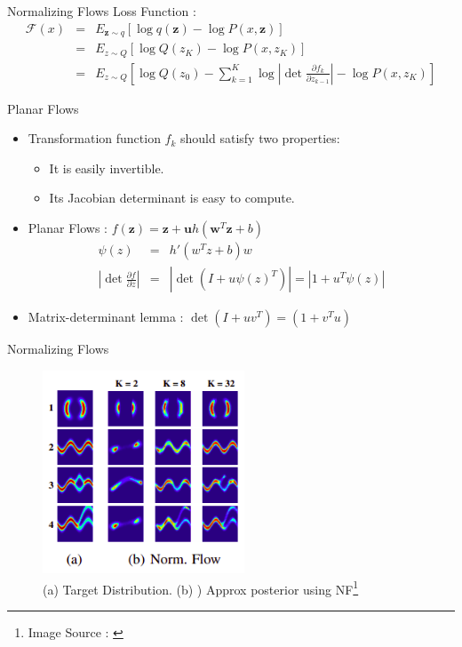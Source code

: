 \documentclass{beamer}
\begin{document}
\begin{frame}{Normalizing Flows}
Loss Function :%
\begin{eqnarray}
\mathcal{F}(x) &=& E_{\mathbf{z} \sim q}[\log q(\mathbf{z}) - \log P(x, \mathbf{z})] \\
&=&  E_{z \sim Q}[\log Q(z_K) - \log P(x, z_K)] \\
&=&  E_{z \sim Q}[\log Q(z_0) - \sum_{k=1}^{K} \log \left| \det \frac{\partial{f_k}}{\partial{z_{k-1}}} \right| - \log P(x, z_K)] \label{vfeflow}
\end{eqnarray}
\end{frame}
\begin{frame}{Planar Flows}
   \begin{itemize}
       \item Transformation function $f_k$ should satisfy two properties:
       \begin{itemize}
           \item It is easily invertible.
           \item Its Jacobian determinant is easy to compute.
       \end{itemize}
       \item Planar Flows : $f(\mathbf{z}) = \mathbf{z} + \mathbf{u} h(\mathbf{w}^T \mathbf{z} + b)$ 
   \begin{eqnarray}
    \psi(z) &=& h'(w^Tz + b)w \\
    \left| \det \frac{\partial{f}}{\partial{z}} \right| &=& \left| \det(I + u \psi (z)^T)  \right| = \left| 1+u^T \psi (z)  \right|
    \end{eqnarray}
    \item Matrix-determinant lemma : $\det(I + uv^T) = (1 + v^Tu)$
    \end{itemize}
\end{frame}
\begin{frame}{Normalizing Flows}
    \begin{figure}
        \centering
        \includegraphics[width=60mm,scale=0.65]{nf-result.png}
        \caption{(a) Target Distribution. (b) ) Approx posterior using NF\footnote{Image Source : \cite{rezende2015variational}}}
        \label{fig:my_label}
    \end{figure}
\end{frame}
\end{document}
